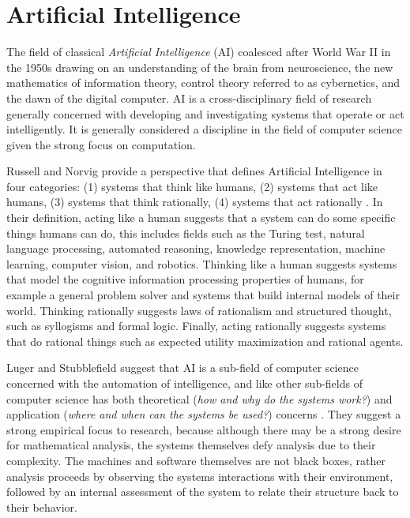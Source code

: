 \documentclass[a4paper, 11pt]{article}
\begin{document}
% 
% 
\section{Artificial Intelligence}
\label{sec:artificial_intelligence}
The field of classical \emph{Artificial Intelligence} (AI) coalesced after World War II in the 1950s drawing on an understanding of the brain from neuroscience, the new mathematics of information theory, control theory referred to as cybernetics, and the dawn of the digital computer. AI is a cross-disciplinary field of research generally concerned with developing and investigating systems that operate or act intelligently. It is generally considered a discipline in the field of computer science given the strong focus on computation.

Russell and Norvig provide a perspective that defines Artificial Intelligence in four categories: (1) systems that think like humans, (2) systems that act like humans, (3) systems that think rationally, (4) systems that act rationally \cite{Russell2009}. In their definition, acting like a human suggests that a system can do some specific things humans can do, this includes fields such as the Turing test, natural language processing, automated reasoning, knowledge representation, machine learning, computer vision, and robotics. Thinking like a human suggests systems that model the cognitive information processing properties of humans, for example a general problem solver and systems that build internal models of their world. Thinking rationally suggests laws of rationalism and structured thought, such as syllogisms and formal logic. Finally, acting rationally suggests systems that do rational things such as expected utility maximization and rational agents. 

Luger and Stubblefield suggest that AI is a sub-field of computer science concerned with the automation of intelligence, and like other sub-fields of computer science has both theoretical (\emph{how and why do the systems work?}) and application (\emph{where and when can the systems be used?}) concerns \cite{Luger1993}. They suggest a strong empirical focus to research, because although there may be a strong desire for mathematical analysis, the systems themselves defy analysis due to their complexity. The machines and software themselves are not black boxes, rather analysis proceeds by observing the systems interactions with their environment, followed by an internal assessment of the system to relate their structure back to their behavior.
\end{document}
